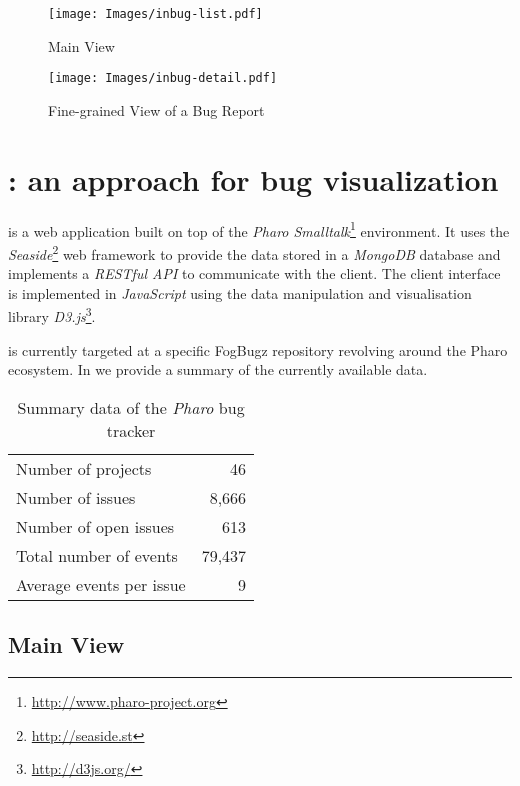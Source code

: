 
\begin{figure*}[ht]
\centering
\texttt{[image: Images/inbug-list.pdf]}
\caption{\ib Main View}
\label{fig-inbug-list}
\end{figure*}

\begin{figure*}
\centering
\texttt{[image: Images/inbug-detail.pdf]}
\caption{Fine-grained View of a Bug Report}
\label{fig-inbug-details}
\end{figure*}

\section{\ib: an approach for bug visualization}

\ib is a web application built on top of the \textit{Pharo Smalltalk}\footnote{\url{http://www.pharo-project.org}} environment. It uses the \textit{Seaside}\footnote{\url{http://seaside.st}} web framework to provide the data stored in a \textit{MongoDB} database and implements a \textit{RESTful API} to communicate with the client. The client interface is implemented in \textit{JavaScript} using the data manipulation and visualisation library \textit{D3.js}\footnote{\url{http://d3js.org/}}.

\ib is currently targeted at a specific FogBugz repository revolving around the Pharo ecosystem. In  we provide a summary of the currently available data.

\begin{table}[ht]
\center
\caption{Summary data of the \textit{Pharo} bug tracker}
\label{tab-tracker-summary}
\begin{tabular}{p{7cm} r}
Number of projects & 46 \\
Number of issues & 8,666 \\
Number of open issues & 613 \\
Total number of events & 79,437 \\
Average events per issue & 9 \\
\end{tabular}
\end{table}

\subsection{\ib Main View} \label{inbug-list}


